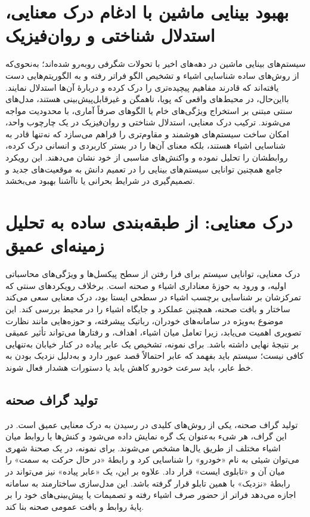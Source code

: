 \clearpage

\section{بهبود بینایی ماشین با ادغام درک معنایی، استدلال شناختی و روان‌فیزیک}
سیستم‌های بینایی ماشین در دهه‌های اخیر با تحولات شگرفی روبه‌رو شده‌اند؛ به‌نحوی‌که از روش‌های ساده شناسایی اشیاء و تشخیص الگو فراتر رفته و به الگوریتم‌هایی دست یافته‌اند که قادرند مفاهیم پیچیده‌تری را درک کرده و دربارهٔ آن‌ها استدلال نمایند. بااین‌حال، در محیط‌های واقعی که پویا، ناهمگن و غیرقابل‌پیش‌بینی هستند، مدل‌های سنتی مبتنی بر استخراج ویژگی‌های خام یا الگوهای صرفاً آماری، با محدودیت مواجه می‌شوند. ترکیب درک معنایی، استدلال شناختی و روان‌فیزیک در یک چارچوب واحد، امکان ساخت سیستم‌های هوشمند و مقاوم‌تری را فراهم می‌سازد که نه‌تنها قادر به شناسایی اشیاء هستند، بلکه معنای آن‌ها را در بستر کاربردی و انسانی درک کرده، روابطشان را تحلیل نموده و واکنش‌های مناسبی از خود نشان می‌دهند. این رویکرد جامع همچنین توانایی سیستم‌های بینایی را در تعمیم دانش به موقعیت‌های جدید و تصمیم‌گیری در شرایط بحرانی یا ناآشنا بهبود می‌بخشد.

\section*{درک معنایی: از طبقه‌بندی ساده به تحلیل زمینه‌ای عمیق}
درک معنایی، توانایی سیستم برای فرا رفتن از سطح پیکسل‌ها و ویژگی‌های محاسباتی اولیه، و ورود به حوزهٔ معناداری اشیاء و صحنه است. برخلاف رویکردهای سنتی که تمرکزشان بر شناسایی برچسب اشیاء در سطحی ایستا بود، درک معنایی سعی می‌کند ساختار و بافت صحنه، همچنین عملکرد و جایگاه اشیاء را در محیط بررسی کند. این موضوع به‌ویژه در سامانه‌های خودران، رباتیک پیشرفته، و حوزه‌هایی مانند نظارت تصویری اهمیت می‌یابد، زیرا تعامل میان اشیاء، اهداف، و رفتارها می‌تواند تأثیر عمیقی بر نتیجهٔ نهایی داشته باشد. برای نمونه، تشخیص یک عابر پیاده در کنار خیابان به‌تنهایی کافی نیست؛ سیستم باید بفهمد که عابر احتمالاً قصد عبور دارد و به‌دلیل نزدیک بودن به خط عابر، باید سرعت خودرو کاهش یابد یا دستورات هشدار فعال شوند.

\subsection*{تولید گراف صحنه}
تولید گراف صحنه، یکی از روش‌های کلیدی در رسیدن به درک معنایی عمیق است. در این گراف، هر شیء به‌عنوان یک گره نمایش داده می‌شود و کنش‌ها یا روابط میان اشیاء مختلف از طریق یال‌ها مشخص می‌شوند. برای نمونه، در یک صحنهٔ شهری می‌توان شیئی به نام «خودرو» را شناسایی کرد و رابطهٔ «در حال حرکت به سمت» را میان آن و «تابلوی ایست» قرار داد. علاوه بر این، یک «عابر پیاده» نیز می‌تواند در رابطهٔ «نزدیک» با همین تابلو قرار گرفته باشد. این مدل‌سازی ساختارمند به سامانه اجازه می‌دهد فراتر از حضور صرف اشیاء رفته و تصمیمات یا پیش‌بینی‌های خود را بر پایهٔ روابط و بافت عمومی صحنه بنا کند.

